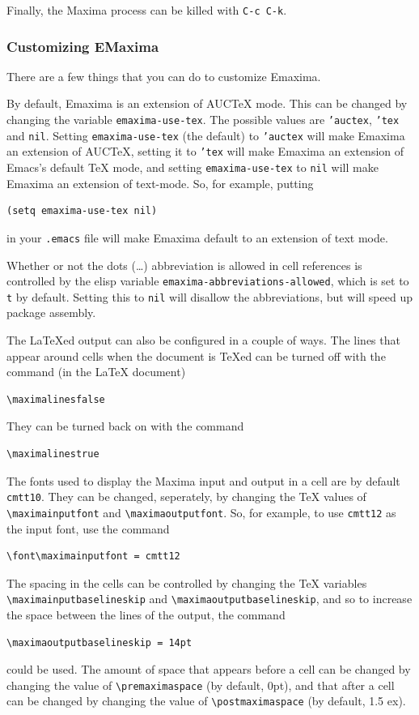 Finally, the Maxima process can be killed with \texttt{C-c C-k}.

\subsubsection{Customizing EMaxima}

\noindent
There are a few things that you can do to customize Emaxima.  

By default, Emaxima is an extension of AUC\TeX{} mode.  This can be
changed by changing the variable \texttt{emaxima-use-tex}.  The possible
values are \texttt{'auctex}, \texttt{'tex} and \texttt{nil}.  Setting
\texttt{emaxima-use-tex} (the default) to \texttt{'auctex} will make Emaxima
an extension of AUC\TeX{}, setting it to \texttt{'tex} will make Emaxima an
extension of Emacs's default \TeX{} mode, and setting
\texttt{emaxima-use-tex} to \texttt{nil} will make Emaxima an extension of
text-mode.  So, for example, putting 
\begin{verbatim}
(setq emaxima-use-tex nil)
\end{verbatim}
\noindent
in your \texttt{.emacs} file will make Emaxima default to an extension of
text mode. 

Whether or not the dots (\dots{}) abbreviation is allowed in cell
references is controlled by the elisp variable
\texttt{emaxima-abbreviations-allowed}, which is set to \texttt{t} by
default.  Setting this to \texttt{nil} will disallow the abbreviations,
but will speed up package assembly.

The \LaTeX{}ed output can also be configured in a couple of ways.
The lines that appear around cells when the document is \TeX{}ed can be
turned off with the command (in the \LaTeX{} document)
\begin{verbatim}
\maximalinesfalse
\end{verbatim}
\noindent
They can be turned back on with the command
\begin{verbatim}
\maximalinestrue
\end{verbatim}
\noindent

The fonts used to display the Maxima input and output in a cell are by
default \texttt{cmtt10}.  They can be changed, seperately, by changing the
\TeX{} values of \verb+\maximainputfont+ and \verb+\maximaoutputfont+.
So, for example, to use \texttt{cmtt12} as the input font, use the command
\begin{verbatim}
\font\maximainputfont = cmtt12
\end{verbatim}
\noindent
The spacing in the cells can be controlled by changing the \TeX{}
variables \verb+\maximainputbaselineskip+ and
\verb+\maximaoutputbaselineskip+, and so to increase the space between
the lines of the output, the command
\begin{verbatim}
\maximaoutputbaselineskip = 14pt
\end{verbatim}
\noindent
could be used.
The amount of space that appears before a cell can be changed by changing
the value of \verb+\premaximaspace+ (by default, 0pt), and that after
a cell can be changed by changing the value of \verb+\postmaximaspace+
(by default, 1.5 ex).
 
